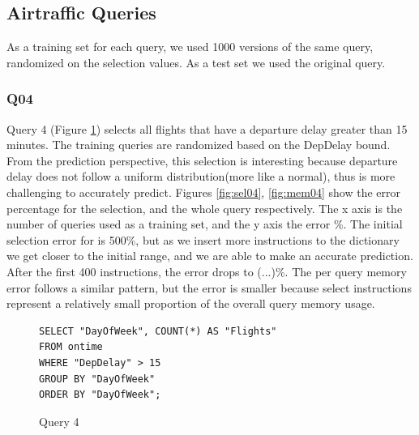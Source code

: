 \subsection{Airtraffic Queries}
As a training set for each query, we used 1000 versions of the
same query, randomized on the selection values. As a test set we used the original
query.
\subsubsection{Q04}
Query 4 (Figure \ref{sel:sql4}) selects all flights that have a departure delay greater than 15 minutes.
The training queries are randomized based on the DepDelay bound.
From the prediction perspective, this selection is interesting because
departure delay does not follow a uniform distribution(more like a normal),
thus is more challenging to accurately predict.
Figures  \ref{fig:sel04}, \ref{fig:mem04} show the error percentage for the
selection, and the whole query respectively. The x axis is the number of queries
used as a training set, and the y axis the error \%. The initial selection error
for is 500\%, but as we insert more instructions to the dictionary we get closer
to the initial range, and we are able to make an accurate prediction. After the
first 400 instructions, the error drops to (...)\%.
The per query memory error follows a similar pattern,
but the error is smaller because select instructions represent a relatively
small proportion of the overall query memory usage.

\begin{figure}[t]
\begin{lstlisting}
SELECT "DayOfWeek", COUNT(*) AS "Flights"
FROM ontime
WHERE "DepDelay" > 15
GROUP BY "DayOfWeek"
ORDER BY "DayOfWeek";
\end{lstlisting}
  \caption{Query 4}
  \label{sel:sql4}
\end{figure}


